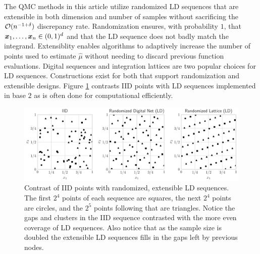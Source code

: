 \documentclass{article}[12pt]
\begin{document}
The QMC methods in this article utilize randomized LD sequences that are extensible in both dimension and number of samples without sacrificing the $\mathcal{O}(n^{-1+\delta})$ discrepancy rate. Randomization ensures, with probability $1$, that $\boldsymbol{x}_1,\dots,\boldsymbol{x}_n \in (0,1)^d$ and that the LD sequence does not badly match the integrand. Extensiblity enables algorithms to adaptively increase the number of points used to estimate $\hat{\mu}$ without needing to discard previous function evaluations. Digital sequences and integration lattices are two popular choices for LD sequences. Constructions exist for both that support randomization and extensible designs. Figure \ref{fig:ld_seqs} contrasts IID points with LD sequences implemented in base $2$ as is often done for computational efficiently.

\begin{figure}[t]
    \centering
    \includegraphics[width=\textwidth]{figs/ld_seqs.pdf}
    \caption{Contrast of IID points with randomized, extensible LD sequences. The first $2^4$ points of each sequence are squares, the next $2^4$ points are circles, and the $2^5$ points following that are triangles. Notice the gaps and clusters in the IID sequence contrasted with the more even coverage of LD sequences. Also notice that as the sample size is doubled the extensible LD sequences fills in the gaps left by previous nodes.}
    \label{fig:ld_seqs}
\end{figure}

\end{document}
